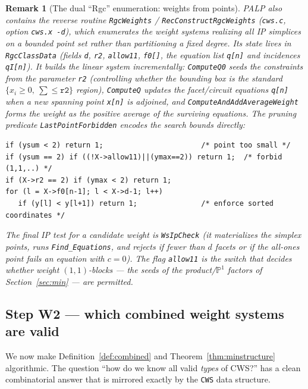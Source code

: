 \documentclass{amsart}
\newtheorem{remark}[theorem]{Remark}
\begin{document}
\begin{remark}[The dual ``Rgc'' enumeration: weights from points]
\label{rmk:rgc}
PALP also contains the \emph{reverse} routine \texttt{RgcWeights} /
\texttt{RecConstructRgcWeights} (\texttt{cws.c}, option \texttt{cws.x -d}),
which enumerates the weight systems realizing all IP simplices on a bounded
point set rather than partitioning a fixed degree. Its state lives in
\texttt{RgcClassData} (fields \texttt{d}, \texttt{r2}, \texttt{allow11},
\texttt{f0[]}, the equation list \texttt{q[n]} and incidences
\texttt{qI[n]}). It builds the linear system incrementally:
\texttt{ComputeQ0} seeds the constraints from the parameter \texttt{r2}
(controlling whether the bounding box is the standard
$\{x_i\ge 0,\ \sum \le \texttt{r2}\}$ region), \texttt{ComputeQ} updates the
facet/circuit equations \texttt{q[n]} when a new spanning point \texttt{x[n]}
is adjoined, and \texttt{ComputeAndAddAverageWeight} forms the weight as the
positive average of the surviving equations. The pruning predicate
\texttt{LastPointForbidden} encodes the search bounds directly:
\begin{verbatim}
if (ysum < 2) return 1;                       /* point too small */
if (ysum == 2) if ((!X->allow11)||(ymax==2)) return 1;  /* forbid (1,1,..) */
if (X->r2 == 2) if (ymax < 2) return 1;
for (l = X->f0[n-1]; l < X->d-1; l++)
   if (y[l] < y[l+1]) return 1;               /* enforce sorted coordinates */
\end{verbatim}
The final IP test for a candidate weight is \texttt{WsIpCheck} (it
materializes the simplex points, runs \texttt{Find\_Equations}, and rejects
if fewer than $d$ facets or if the all-ones point fails an equation with
$c=0$). The flag \texttt{allow11} is the switch that decides whether weight
$(1,1)$-blocks --- the seeds of the product/$\mathbb{P}^1$ factors of
Section~\ref{sec:min} --- are permitted.
\end{remark}

\subsection{Step W2 --- which combined weight systems are valid}
\label{sec:algo-cws}

We now make Definition~\ref{def:combined} and
Theorem~\ref{thm:minstructure} algorithmic. The question ``how do we know
all valid \emph{types} of CWS?'' has a clean combinatorial answer that is
mirrored exactly by the \texttt{CWS} data structure.
\end{document}
